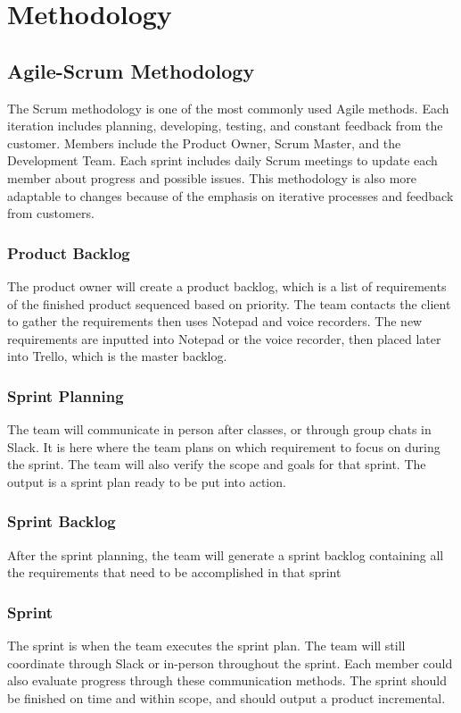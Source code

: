 \chapter{Methodology}

\section{Agile-Scrum Methodology}
The Scrum methodology is one of the most commonly used Agile methods. Each iteration includes planning, developing, testing, and constant feedback from the customer. Members include the Product Owner, Scrum Master, and the Development Team. Each sprint includes daily Scrum meetings to update each member about progress and possible issues. This methodology is also more adaptable to changes because of the emphasis on iterative processes and feedback from customers.

\subsection{Product Backlog}
The product owner will create a product backlog, which is a list of requirements of the finished product sequenced based on priority. The team contacts the client to gather the requirements then uses Notepad and voice recorders. The new requirements are inputted into Notepad or the voice recorder, then placed later into Trello, which is the master backlog.

\subsection{Sprint Planning}
The team will communicate in person after classes, or through group chats in Slack. It is here where the team plans on which requirement to focus on during the sprint. The team will also verify the scope and goals for that sprint. The output is a sprint plan ready to be put into action.

\subsection{Sprint Backlog}
After the sprint planning, the team will generate a sprint backlog containing all the requirements that need to be accomplished in that sprint

\subsection{Sprint}
The sprint is when the team executes the sprint plan. The team will still coordinate through Slack or in-person throughout the sprint. Each member could also evaluate progress through these communication methods. The sprint should be finished on time and within scope, and should output a product incremental.

